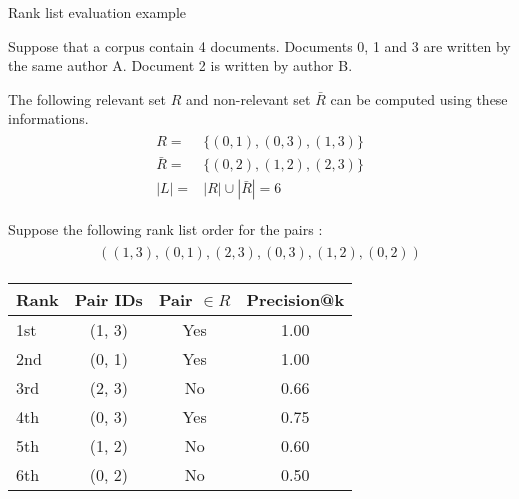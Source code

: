 \begin{example}
  \centering
  \caption{Rank list evaluation example}
  \label{ex:rank_list_eval}


  \begin{subexample}{\linewidth}

  Suppose that a corpus contain 4 documents.
  Documents 0, 1 and 3 are written by the same author A.
  Document 2 is written by author B.

  The following relevant set $R$ and non-relevant set $\bar{R}$ can be computed using these informations.
  \begin{gather*}
    \begin{split}
            R =& \{(0, 1), (0, 3), (1, 3) \} \\
      \bar{R} =& \{(0, 2), (1, 2), (2, 3) \} \\
          |L| =& |R| \cup |\bar{R}| = 6
    \end{split}
  \end{gather*}

  Suppose the following rank list order for the pairs :
  \begin{gather*}
    \begin{split}
      ((1, 3), (0, 1), (2, 3), (0, 3), (1, 2), (0, 2))
    \end{split}
  \end{gather*}
  \end{subexample}

  \vspace{0.5cm}

  \begin{subexample}{\linewidth}
    \centering
    \begin{tabular}{l c c c}
      \toprule
      Rank  & Pair IDs & Pair $\in R$ & Precision@k\\
      \midrule
      1st   & (1, 3)   & Yes  & 1.00 \\
      2nd   & (0, 1)   & Yes  & 1.00 \\
      3rd   & (2, 3)   & No   & 0.66 \\
      4th   & (0, 3)   & Yes  & 0.75 \\
      5th   & (1, 2)   & No   & 0.60 \\
      6th   & (0, 2)   & No   & 0.50 \\
      \bottomrule
    \end{tabular}
  \end{subexample}


\end{example}
